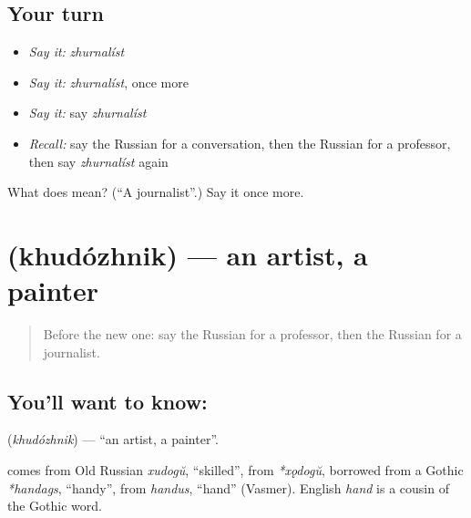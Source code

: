 \subsection*{Your turn}
\begin{itemize}
\raggedright
  \item \emph{Say it:} \emph{zhurnalíst}
  \item \emph{Say it:} \emph{zhurnalíst}, once more
  \item \emph{Say it:} say \emph{zhurnalíst}
  \item \emph{Recall:} say the Russian for a conversation, then the Russian for a professor, then say \emph{zhurnalíst} again
\end{itemize}

\begin{tcolorbox}[breakable,colback=teal!4,colframe=teal!35!black,title={Before you move on}]
What does  mean? (\textquotedblleft{}A journalist\textquotedblright{}.) Say it once more.
\end{tcolorbox}
\section[\texorpdfstring{\ru{художник} (khudózhnik)}{художник (khudózhnik)}]{ (khudózhnik) — an artist, a painter}

\label{lesson:RU-C256-khudozhnik}



\begin{quote}
Before the new one: say the Russian for a professor, then the Russian for a journalist.
\end{quote}

\subsection*{You'll want to know: }
\textbf{} (\emph{khudózhnik}) — \textquotedblleft{}an artist, a painter\textquotedblright{}.

\begin{cousinweb}
\textbf{} comes from Old Russian \emph{xudogŭ}, \textquotedblleft{}skilled\textquotedblright{}, from \emph{*xǫdogŭ}, borrowed from a Gothic \emph{*handags}, \textquotedblleft{}handy\textquotedblright{}, from \emph{handus}, \textquotedblleft{}hand\textquotedblright{} (Vasmer). English \emph{hand} is a cousin of the Gothic word.
\end{cousinweb}

